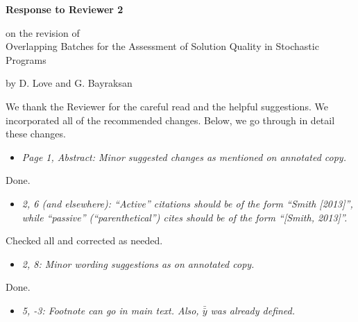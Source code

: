 \documentclass[11pt,notitlepage,onecolumn]{article}
\newcommand{\noi}{\noindent}
\begin{document}

\singlespacing

\baselineskip0.26in


\pagebreak

\begin{center}
\textbf{\Large Response to Reviewer 2} 
\medskip

on the revision of\\ 


{\large Overlapping Batches for the Assessment of Solution Quality in Stochastic Programs}
\medskip

{\footnotesize by D. Love and G. Bayraksan}
\end{center}

\bigskip


\noi
We thank the Reviewer for the careful read and the helpful suggestions. 
We incorporated all of the recommended changes. 
Below, we go through in detail these changes. 
\medskip

\bigskip 

\begin{itemize}
\item \textit{Page 1, Abstract: Minor suggested changes as mentioned on annotated copy.}
\end{itemize}

\noi 
Done. 
\medskip

\begin{itemize}
\item \textit{2, 6 (and elsewhere): ``Active'' citations should be of the form ``Smith [2013]'', while ``passive'' (``parenthetical'') cites should be of the form ``[Smith, 2013]''.}
\end{itemize}

\noi 
Checked all and corrected as needed. 
\medskip


\begin{itemize}
\item \textit{2, 8: Minor wording suggestions as on annotated copy.}
\end{itemize}


\noindent 
Done. 
\medskip 


\begin{itemize}
\item \textit{5, -3: Footnote can go in main text. Also, $\bar{\bar{y}}$ was already defined.}
\end{itemize}
\end{document}
